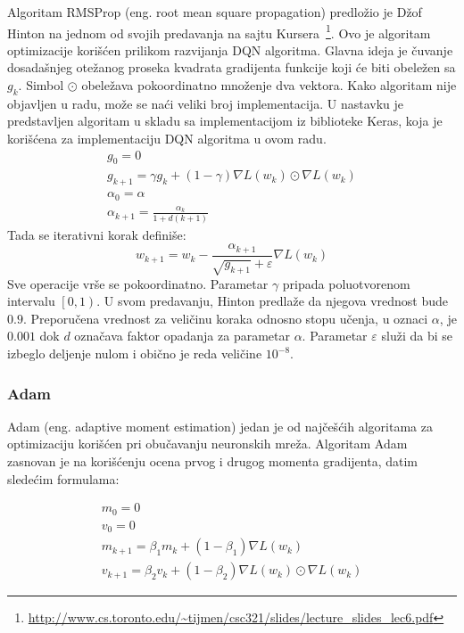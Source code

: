Algoritam RMSProp (eng. root mean square propagation) predložio je Džof Hinton na jednom od svojih predavanja na sajtu Kursera~\footnote{\url{http://www.cs.toronto.edu/~tijmen/csc321/slides/lecture_slides_lec6.pdf}}. Ovo je algoritam optimizacije korišćen prilikom razvijanja DQN algoritma. Glavna ideja je čuvanje dosadašnjeg otežanog proseka kvadrata gradijenta funkcije koji će biti obeležen sa $g_k$. Simbol $\odot$ obeležava pokoordinatno množenje dva vektora. Kako algoritam nije objavljen u radu, može se naći veliki broj implementacija. U nastavku je predstavljen algoritam u skladu sa implementacijom iz biblioteke Keras, koja je korišćena za implementaciju DQN algoritma u ovom radu.
\begin{equation}
	\begin{gathered}
		g_0 = 0 \\
		g_{k+1} = \gamma g_k + (1 - \gamma)\nabla L(w_k) \odot \nabla L(w_k) \\
		\alpha_0 = \alpha \\
		\alpha_{k+1} = \frac{\alpha_k}{1+d(k+1)}	
	\end{gathered}
\end{equation}
Tada se iterativni korak definiše: 
\begin{equation}
	w_{k+1} = w_k - \frac{\alpha_{k+1}}{\sqrt{g_{k+1}} + \varepsilon} \nabla L(w_k)
\end{equation}
Sve operacije vrše se pokoordinatno. Parametar $\gamma$ pripada poluotvorenom intervalu $\left[0, 1\right) $. U svom predavanju, Hinton predlaže da njegova vrednost bude $0.9$. Preporučena vrednost za veličinu koraka odnosno stopu učenja, u oznaci $\alpha$, je $0.001$ dok $d$ označava faktor opadanja za parametar $\alpha$. Parametar $\varepsilon$ služi da bi se izbeglo deljenje nulom i obično je reda veličine $10^{-8}$.

\subsubsection{Adam}

Adam (eng. adaptive moment estimation) jedan je od najčešćih algoritama za optimizaciju korišćen pri obučavanju neuronskih mreža. Algoritam Adam zasnovan je na korišćenju ocena prvog i drugog momenta gradijenta, datim sledećim formulama:

\begin{equation}
	\begin{gathered}
			m_0 = 0 \\
			v_0 = 0 \\ 
			m_{k+1} = \beta_1 m_k + (1-\beta_1) \nabla L(w_k) \\
			v_{k+1} = \beta_2 v_k + (1-\beta_2) \nabla L(w_k) \odot \nabla L(w_k) 
	\end{gathered}
\end{equation}

